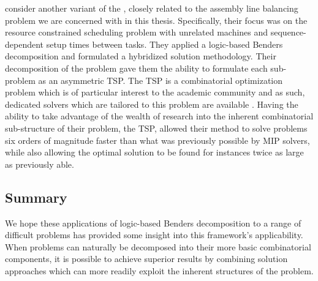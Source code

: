  consider another variant of the \RCPSP,
closely related to the assembly line balancing
problem we are concerned with in this thesis.
Specifically, their focus was on the resource constrained scheduling problem
with unrelated machines and sequence-dependent setup times between tasks.
They applied a logic-based Benders decomposition and formulated
a hybridized solution methodology.
Their decomposition of the problem gave them the
ability to formulate each sub-problem as an asymmetric TSP.
The TSP is a combinatorial optimization problem which is of
particular interest to the academic community and as such,
dedicated solvers which are tailored to this problem
are available \cite{Applegate2017}.
Having the ability to take advantage of the wealth of 
research into the inherent combinatorial sub-structure of their problem,
the TSP, allowed their method to solve problems
six orders of magnitude faster than what was previously possible
by MIP solvers, while also allowing the optimal solution
to be found for instances twice as large as previously able.

\subsection{Summary}
We hope these applications of logic-based Benders decomposition
to a range of difficult problems has provided
some insight into this framework's applicability.
When problems can naturally be decomposed into their more basic
combinatorial components, it is possible to achieve superior
results by combining solution approaches which can more readily
exploit the inherent structures of the problem.